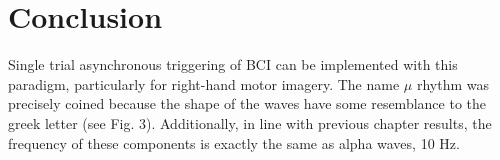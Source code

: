    
\section{Conclusion}

Single trial asynchronous triggering of BCI can be implemented with this paradigm, particularly for right-hand motor imagery. The name $\mu$ rhythm was precisely coined because the shape of the waves have some resemblance to the greek letter (see Fig. 3).  Additionally, in line with previous chapter results, the frequency of these components is exactly the same as alpha waves, 10 Hz.
